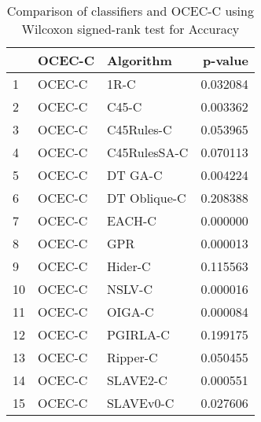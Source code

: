 \begin{table}
\footnotesize
\caption{Comparison of classifiers and OCEC-C using Wilcoxon signed-rank test for Accuracy}
\label{tab:OCEC-C wilcoxon Accuracy comparison}
\begin{tabular}{lllr}
\hline
 & OCEC-C & Algorithm & p-value \\
\hline
1 & OCEC-C & 1R-C & 0.032084 \\
2 & OCEC-C & C45-C & 0.003362 \\
3 & OCEC-C & C45Rules-C & 0.053965 \\
4 & OCEC-C & C45RulesSA-C & 0.070113 \\
5 & OCEC-C & DT GA-C & 0.004224 \\
6 & OCEC-C & DT Oblique-C & 0.208388 \\
7 & OCEC-C & EACH-C & 0.000000 \\
8 & OCEC-C & GPR & 0.000013 \\
9 & OCEC-C & Hider-C & 0.115563 \\
10 & OCEC-C & NSLV-C & 0.000016 \\
11 & OCEC-C & OIGA-C & 0.000084 \\
12 & OCEC-C & PGIRLA-C & 0.199175 \\
13 & OCEC-C & Ripper-C & 0.050455 \\
14 & OCEC-C & SLAVE2-C & 0.000551 \\
15 & OCEC-C & SLAVEv0-C & 0.027606 \\
\hline
\end{tabular}
\end{table}
